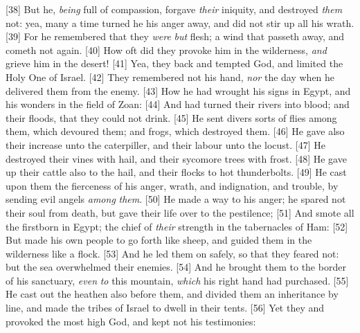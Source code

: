[38] \textcolor[cmyk]{0.99998,1,0,0}{But he, \emph{being} full of compassion, forgave \emph{their} iniquity, and destroyed \emph{them} not: yea, many a time turned he his anger away, and did not stir up all his wrath.}
[39] \textcolor[cmyk]{0.99998,1,0,0}{For he remembered that they \emph{were} \emph{but} flesh; a wind that passeth away, and cometh not again.}
[40] \textcolor[cmyk]{0.99998,1,0,0}{How oft did they provoke him in the wilderness, \emph{and} grieve him in the desert!}
[41] \textcolor[cmyk]{0.99998,1,0,0}{Yea, they  back and tempted God, and limited the Holy One of Israel.}
[42] \textcolor[cmyk]{0.99998,1,0,0}{They remembered not his hand, \emph{nor} the day when he delivered them from the enemy.}
[43] \textcolor[cmyk]{0.99998,1,0,0}{How he had wrought his signs in Egypt, and his wonders in the field of Zoan:}
[44] \textcolor[cmyk]{0.99998,1,0,0}{And had turned their rivers into blood; and their floods, that they could not drink.}
[45] \textcolor[cmyk]{0.99998,1,0,0}{He sent divers sorts of flies among them, which devoured them; and frogs, which destroyed them.}
[46] \textcolor[cmyk]{0.99998,1,0,0}{He gave also their increase unto the caterpiller, and their labour unto the locust.}
[47] \textcolor[cmyk]{0.99998,1,0,0}{He destroyed their vines with hail, and their sycomore trees with frost.}
[48] \textcolor[cmyk]{0.99998,1,0,0}{He gave up their cattle also to the hail, and their flocks to hot thunderbolts.}
[49] \textcolor[cmyk]{0.99998,1,0,0}{He cast upon them the fierceness of his anger, wrath, and indignation, and trouble, by sending evil angels \emph{among} \emph{them}.}
[50] \textcolor[cmyk]{0.99998,1,0,0}{He made a way to his anger; he spared not their soul from death, but gave their life over to the pestilence;}
[51] \textcolor[cmyk]{0.99998,1,0,0}{And smote all the firstborn in Egypt; the chief of \emph{their} strength in the tabernacles of Ham:}
[52] \textcolor[cmyk]{0.99998,1,0,0}{But made his own people to go forth like sheep, and guided them in the wilderness like a flock.}
[53] \textcolor[cmyk]{0.99998,1,0,0}{And he led them on safely, so that they feared not: but the sea overwhelmed their enemies.}
[54] \textcolor[cmyk]{0.99998,1,0,0}{And he brought them to the border of his sanctuary, \emph{even} \emph{to} this mountain, \emph{which} his right hand had purchased.}
[55] \textcolor[cmyk]{0.99998,1,0,0}{He cast out the heathen also before them, and divided them an inheritance by line, and made the tribes of Israel to dwell in their tents.}
[56] \textcolor[cmyk]{0.99998,1,0,0}{Yet they  and provoked the most high God, and kept not his testimonies:}
